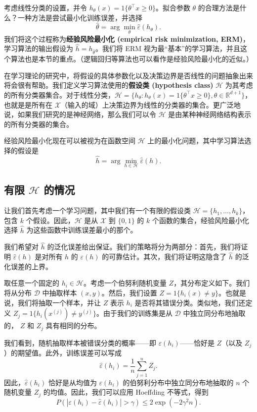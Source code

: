 考虑线性分类的设置，并令 $h_\theta(x) = {1}\{\theta^\top x \geq 0\}$。拟合参数 $\theta$ 的合理方法是什么？一种方法是尝试最小化训练误差，并选择
\[
    \hat{\theta} = \arg \min_\theta \hat{\varepsilon}(h_\theta).
\]
我们将这个过程称为\textbf{经验风险最小化 (empirical risk minimization, ERM)}，学习算法的输出假设为 $\hat{h} = h_{\hat{\theta}}$。我们将 ERM 视为最“基本”的学习算法，并且这个算法也是本节的重点。（逻辑回归等算法也可以看作是经验风险最小化的近似。）

在学习理论的研究中，将假设的具体参数化以及决策边界是否线性的问题抽象出来将会很有帮助。我们定义学习算法使用的\textbf{假设类 (hypothesis class)} $\mathcal{H}$ 为其考虑的所有分类器集合。对于线性分类，$\mathcal{H} = \{h_\theta: h_\theta(x) = {1}\{\theta^\top x \geq 0\}, \theta \in \mathbb{R}^{d+1}\}$，也就是是所有在 $\mathcal{X}$（输入的域）上决策边界为线性的分类器的集合。更广泛地说，如果我们研究的是神经网络，那么我们可以令 $\mathcal{H}$ 是由某种神经网络结构表示的所有分类器的集合。

经验风险最小化现在可以被视为在函数空间 $\mathcal{H}$ 上的最小化问题，其中学习算法选择的假设是
\[
    \hat{h} = \arg \min_{h \in \mathcal{H}} \hat{\varepsilon}(h).
\]

\subsection{有限 \texorpdfstring{$\mathcal{H}$}{H} 的情况}

让我们首先考虑一个学习问题，其中我们有一个有限的假设类 $\mathcal{H} = \{h_1, \dots, h_k\}$，包含 $k$ 个假设。因此，$\mathcal{H}$ 是从 $\mathcal{X}$ 到 $\{0, 1\}$ 的 $k$ 个函数的集合，经验风险最小化选择 $\hat{h}$ 为这些函数中训练误差最小的那个。

我们希望对 $\hat{h}$ 的泛化误差给出保证。我们的策略将分为两部分：首先，我们将证明 $\hat{\varepsilon}(h)$ 是对所有 $h$ 的 $\varepsilon(h)$ 的可靠估计。其次，我们将证明这隐含了 $\hat{h}$ 的泛化误差的上界。

取任意一个固定的 $h_i \in \mathcal{H}$。考虑一个伯努利随机变量 $Z$，其分布定义如下。我们将从分布 $\mathcal{D}$ 中抽取样本 $(x, y)$。然后，我们设置 $Z = {1}\{h_i(x) \neq y\}$。也就是说，我们将抽取一个样本，并让 $Z$ 表示 $h_i$ 是否将其错误分类。类似地，我们还定义 $Z_j = {1}\{h_i(x^{(j)}) \neq y^{(j)}\}$。由于我们的训练集是从 $\mathcal{D}$ 中独立同分布地抽取的， $Z$ 和 $Z_j$ 具有相同的分布。

我们看到，随机抽取样本被错误分类的概率——即 $\varepsilon(h_i)$——恰好是 $Z$（以及 $Z_j$）的期望值。此外，训练误差可以写成
\[
    \hat{\varepsilon}(h_i) = \frac{1}{n} \sum_{j=1}^n Z_j.
\]
因此，$\hat{\varepsilon}(h_i)$ 恰好是从均值为 $\varepsilon(h_i)$ 的伯努利分布中独立同分布地抽取的 $n$ 个随机变量 $Z_j$ 的均值。因此，我们可以应用 Hoeffding 不等式，得到
\[
    P(|\varepsilon(h_i) - \hat{\varepsilon}(h_i)| > \gamma) \leq 2 \exp(-2\gamma^2 n).
\]

